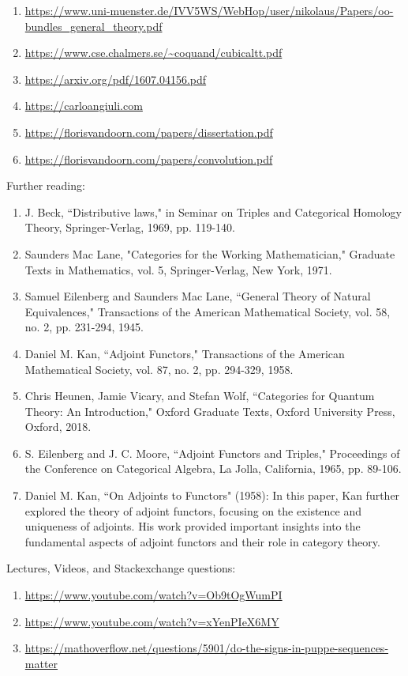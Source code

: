\documentclass{book}
\theoremstyle{definition}
\begin{document}
{{\begin{enumerate}
\item \url{https://www.uni-muenster.de/IVV5WS/WebHop/user/nikolaus/Papers/oo-bundles_general_theory.pdf}
\item \url{https://www.cse.chalmers.se/~coquand/cubicaltt.pdf}
\item \url{https://arxiv.org/pdf/1607.04156.pdf}
\item \url{https://carloangiuli.com}
\item \url{https://florisvandoorn.com/papers/dissertation.pdf}
\item \url{https://florisvandoorn.com/papers/convolution.pdf}
\end{enumerate}

Further reading:

\begin{enumerate}
\item J. Beck, ``Distributive laws," in Seminar on Triples and Categorical Homology Theory, Springer-Verlag, 1969, pp. 119-140.
\item Saunders Mac Lane, "Categories for the Working Mathematician," Graduate Texts in Mathematics, vol. 5, Springer-Verlag, New York, 1971.
\item Samuel Eilenberg and Saunders Mac Lane, ``General Theory of Natural Equivalences," Transactions of the American Mathematical Society, vol. 58, no. 2, pp. 231-294, 1945.
\item Daniel M. Kan, ``Adjoint Functors," Transactions of the American Mathematical Society, vol. 87, no. 2, pp. 294-329, 1958.
\item Chris Heunen, Jamie Vicary, and Stefan Wolf, ``Categories for Quantum Theory: An Introduction," Oxford Graduate Texts, Oxford University Press, Oxford, 2018.
\item S. Eilenberg and J. C. Moore, ``Adjoint Functors and Triples," Proceedings of the Conference on Categorical Algebra, La Jolla, California, 1965, pp. 89-106.
\item Daniel M. Kan, ``On Adjoints to Functors" (1958): In this paper, Kan further explored the theory of adjoint functors, focusing on the existence and uniqueness of adjoints. His work provided important insights into the fundamental aspects of adjoint functors and their role in category theory.
\end{enumerate}

Lectures, Videos, and Stackexchange questions:

\begin{enumerate}
\item \url{https://www.youtube.com/watch?v=Ob9tOgWumPI}
\item \url{https://www.youtube.com/watch?v=xYenPIeX6MY}
\item \url{https://mathoverflow.net/questions/5901/do-the-signs-in-puppe-sequences-matter}
\end{enumerate}

}}
\end{document}

